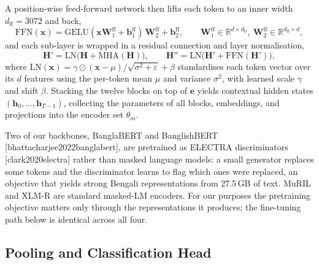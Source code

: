 \documentclass[11pt,a4paper]{article}
\def\citep#1{[#1]}%
\begin{document}
A position-wise feed-forward network then lifts each token to an inner width $d_{\mathrm{ff}} = 3072$ and back,
\begin{equation}
\mathrm{FFN}(\mathbf{x}) = \mathrm{GELU}(\mathbf{x}\mathbf{W}_1^{\mathrm{ff}} + \mathbf{b}_1^{\mathrm{ff}})\,\mathbf{W}_2^{\mathrm{ff}} + \mathbf{b}_2^{\mathrm{ff}},
\qquad \mathbf{W}_1^{\mathrm{ff}} \in \mathbb{R}^{d \times d_{\mathrm{ff}}},\ \mathbf{W}_2^{\mathrm{ff}} \in \mathbb{R}^{d_{\mathrm{ff}} \times d},
\label{eq:ffn}
\end{equation}
and each sub-layer is wrapped in a residual connection and layer normalisation,
\begin{equation}
\mathbf{H}' = \mathrm{LN}\!\big(\mathbf{H} + \mathrm{MHA}(\mathbf{H})\big),
\qquad
\mathbf{H}'' = \mathrm{LN}\!\big(\mathbf{H}' + \mathrm{FFN}(\mathbf{H}')\big),
\label{eq:block}
\end{equation}
where $\mathrm{LN}(\mathbf{x}) = \gamma \odot (\mathbf{x} - \mu)/\sqrt{\sigma^2 + \varepsilon} + \beta$ standardises each token vector over its $d$ features using the per-token mean $\mu$ and variance $\sigma^2$, with learned scale $\gamma$ and shift $\beta$. Stacking the twelve blocks on top of $\mathbf{e}$ yields contextual hidden states $(\mathbf{h}_0, \ldots, \mathbf{h}_{T-1})$, collecting the parameters of all blocks, embeddings, and projections into the encoder set $\theta_m$.

Two of our backbones, BanglaBERT and BanglishBERT \citep{bhattacharjee2022banglabert}, are pretrained as ELECTRA discriminators \citep{clark2020electra} rather than masked language models: a small generator replaces some tokens and the discriminator learns to flag which ones were replaced, an objective that yields strong Bengali representations from 27.5\,GB of text. MuRIL and XLM-R are standard masked-LM encoders. For our purposes the pretraining objective matters only through the representations it produces; the fine-tuning path below is identical across all four.

\subsection{Pooling and Classification Head}
\label{sec:head}
\end{document}
